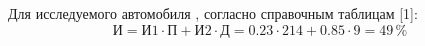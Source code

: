 Для исследуемого автомобиля , согласно справочным таблицам [1]:
\begin{equation}\label{eqsnosr}
\text{И} =\text{И1}\cdot\text{П}+\text{И2}\cdot \text{Д} = 0.23\cdot 214  + 0.85\cdot 9 = 49 \, \%
\end{equation}
%
%
